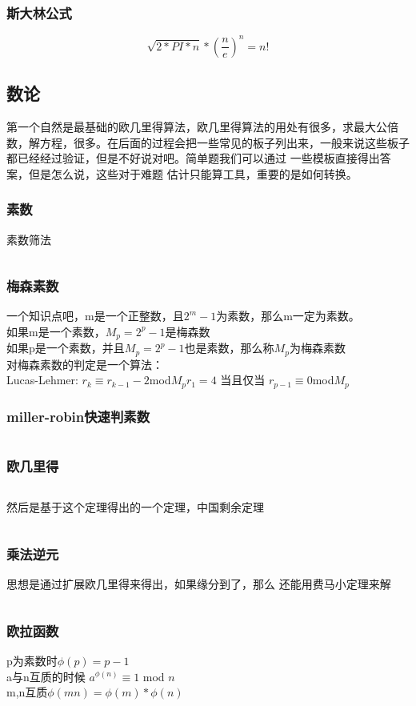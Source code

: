 \documentclass[a4paper,11pt]{article}
\begin{document}
\begin{CJK}{UTF8}{gbsn}
\subsubsection{斯大林公式}
$$\sqrt{2*PI*n} * (\frac{n}{e})^n = n!$$
\subsection{数论}
第一个自然是最基础的欧几里得算法，欧几里得算法的用处有很多，求最大公倍数，解方程，很多。在后面的过程会把一些常见的板子列出来，一般来说这些板子
都已经经过验证，但是不好说对吧。简单题我们可以通过
一些模板直接得出答案，但是怎么说，这些对于难题
估计只能算工具，重要的是如何转换。
\subsubsection{素数}
素数筛法
\inputminted{c++}{../scoure/math/shai.cpp}
\subsubsection{梅森素数}
一个知识点吧，m是一个正整数，且$2^m-1$为素数，那么m一定为素数。\\
如果m是一个素数，$M_p = 2^p-1$是梅森数\\
如果p是一个素数，并且$M_p = 2^p-1$也是素数，那么称$M_p$为梅森素数\\
对梅森素数的判定是一个算法：\\
Lucas-Lehmer:
$r_k \equiv r_{k-1} -2$\quad mod$M_p$\quad $r_1 = 4$
当且仅当 $r_{p-1} \equiv 0$\quad mod$M_p$
\subsubsection{miller-robin快速判素数}
\inputminted{c++}{../scoure/math/miller_robin.cpp}
\subsubsection{欧几里得}
\inputminted{c++}{../scoure/math/GCD.cpp}
然后是基于这个定理得出的一个定理，中国剩余定理
\inputminted{c++}{../scoure/math/chineseshengyu.cpp}
\subsubsection{乘法逆元}
思想是通过扩展欧几里得来得出，如果缘分到了，那么
还能用费马小定理来解
\inputminted{c++}{../scoure/math/niyuan.cpp}
\subsubsection{欧拉函数}
p为素数时$\phi(p) = p-1 $\\
a与n互质的时候 $a^{\phi(n)}\equiv 1$ mod $ n$\\
m,n互质$\phi(mn) = \phi(m) * \phi(n)$\\


\end{CJK}
\end{document}
